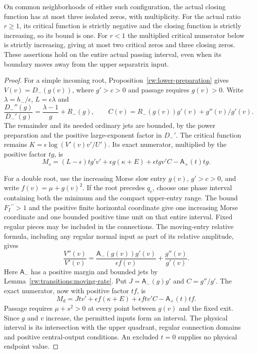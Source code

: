 \begin{proposition}
\label{rw:finite:upper-loss}
On common neighborhoods of either such configuration, the actual
closing function has at most three isolated zeros, with multiplicity.
For the actual ratio $r\ge1$, its critical function is strictly
negative and the closing function is strictly increasing, so its bound
is one. For $r<1$ the multiplied critical numerator below is strictly
increasing, giving at most two critical zeros and three closing zeros.
These assertions hold on the entire actual passing interval, even
when its boundary moves away from the upper separatrix input.
\end{proposition}
\begin{proof}
For a simple incoming root, Proposition~\ref{rw:lower-preparation} gives
$V(v)=D_-(g(v))$, where $g'>c>0$ and passage requires $g(v)>0$.
Write $\lambda=h_-/\epsilon$, $L=\epsilon\lambda$ and
\[
 \frac{D_-''(g)}{D_-'(g)}=\frac{\lambda-1}{g}+R_-(g),
 \qquad C(v)=R_-(g(v))g'(v)+g''(v)/g'(v).
\]
The remainder and its needed ordinary jets are bounded, by the
power preparation and the positive large-exponent factor in $D_-'$.
The critical function remains
$K=\epsilon\log(V'(v)v'/U')$. Its exact numerator, multiplied
by the positive factor $tg$, is
\begin{equation}\label{rw:finite:upper-simple-numerator}
 M_s=(L-\epsilon)tg'v'+\epsilon g(\kappa+E)
                 +\epsilon tgv'C-\mathsf A_+(t)tg.
\end{equation}

For a double root, use the increasing Morse slow entry $g(v)$,
$g'>c>0$, and write $f(v)=\mu+g(v)^2$. If the root precedes
$q_c$, choose one phase interval containing both the minimum and
the compact upper-entry range. The bound $F_I\!{}^{\prime\prime}>1$
and the positive finite horizontal coordinate
give one increasing Morse coordinate and one bounded positive time
unit on that entire interval. Fixed regular pieces may be included
in the connections. The moving-entry relative formula,
including any regular normal input as part of its relative amplitude,
gives
\[
 \frac{V''(v)}{V'(v)}
 =\frac{\mathsf A_-(g(v))g'(v)}{\epsilon f(v)}+\frac{g''(v)}{g'(v)}.
\]
Here $\mathsf A_-$ has a positive margin and bounded jets by
Lemma~\ref{rw:transitions:moving-rate}. Put
$J=\mathsf A_-(g)g'$ and $C=g''/g'$. The exact numerator, now with
positive factor $tf$, is
\begin{equation}\label{rw:finite:upper-double-numerator}
 M_d=Jtv'+\epsilon f(\kappa+E)+\epsilon ftv'C-\mathsf A_+(t)tf.
\end{equation}
Passage requires $\mu+s^2>0$ at every point between $g(v)$ and
the fixed exit. Since $g$ and $v$ increase, the permitted inputs form
an interval. The physical interval is its intersection with the upper
quadrant, regular connection domains and positive central-output
conditions. An excluded $t=0$ supplies no physical endpoint value.


\end{proof}

